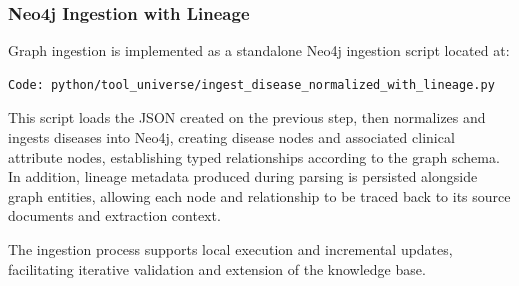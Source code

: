 \subsubsection{Neo4j Ingestion with Lineage}

Graph ingestion is implemented as a standalone Neo4j ingestion script located at:
\begin{verbatim}
Code: python/tool_universe/ingest_disease_normalized_with_lineage.py
\end{verbatim}

This script loads the JSON created on the previous step, then normalizes and ingests diseases into Neo4j, creating disease nodes and associated clinical attribute nodes, establishing typed relationships according to the graph schema. In addition, lineage metadata produced during parsing is persisted alongside graph entities, allowing each node and relationship to be traced back to its source documents and extraction context.

The ingestion process supports local execution and incremental updates, facilitating iterative validation and extension of the knowledge base.

